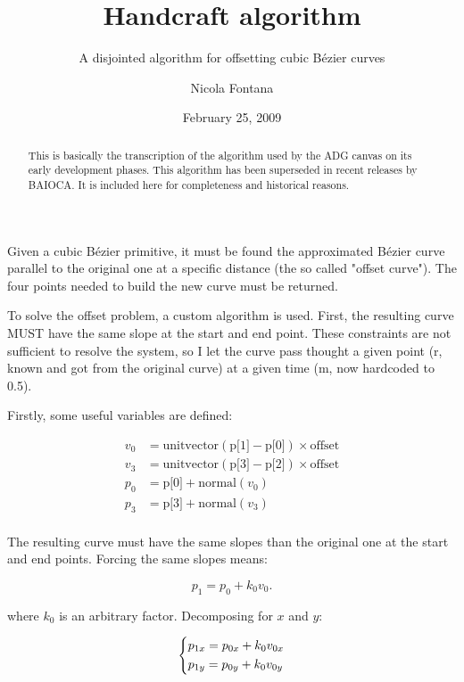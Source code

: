 \documentclass{scrartcl}
\title{Handcraft algorithm}
\subtitle{A disjointed algorithm for offsetting cubic Bézier curves}
\author{Nicola Fontana}
\date{February 25, 2009}
\begin{document}
\maketitle

\begin{abstract}
This is basically the transcription of the algorithm used by the
ADG canvas on its early development phases. This algorithm has been
superseded in recent releases by BAIOCA. It is included here for
completeness and historical reasons.
\end{abstract}

Given a cubic Bézier primitive, it must be found the approximated
Bézier curve parallel to the original one at a specific distance
(the so called "offset curve"). The four points needed to build
the new curve must be returned.

To solve the offset problem, a custom algorithm is used. First, the
resulting curve MUST have the same slope at the start and end point.
These constraints are not sufficient to resolve the system, so I let
the curve pass thought a given point (r, known and got from the
original curve) at a given time (m, now hardcoded to 0.5).

Firstly, some useful variables are defined:

\begin{equation*}
\begin{split}
    v_0 &= \text{unitvector}(\text{p[1]} - \text{p[0]}) \times \text{offset} \\
    v_3 &= \text{unitvector}(\text{p[3]} - \text{p[2]}) \times \text{offset} \\
    p_0 &= \text{p[0]} + \text{normal}(v_0) \\
    p_3 &= \text{p[3]} + \text{normal}(v_3) \\
\end{split}
\end{equation*}

The resulting curve must have the same slopes than the original
one at the start and end points. Forcing the same slopes means:

\begin{equation*}
p_1 = p_0 + k_0 v_0.
\end{equation*}

where $k_0$ is an arbitrary factor. Decomposing for $x$ and $y$:

\begin{equation*}
\begin{dcases}
    p_{1x} = p_{0x} + k_0 v_{0x} \\
    p_{1y} = p_{0y} + k_0 v_{0y} \\
\end{dcases}
\end{equation*}
\end{document}
